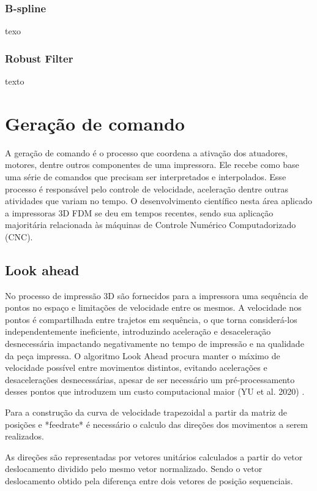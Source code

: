 \subsubsection{B-spline}
texo
\subsubsection{Robust Filter}
texto




\section{Geração de comando}
A geração de comando é o processo que coordena a ativação dos 
atuadores, motores, dentre outros componentes de uma impressora. 
Ele recebe como base uma série de comandos que precisam ser 
interpretados e interpolados. Esse processo é responsável pelo 
controle de velocidade, aceleração dentre outras atividades que 
variam no tempo. O desenvolvimento científico nesta área 
aplicado a impressoras 3D FDM se deu em tempos recentes, 
sendo sua aplicação majoritária relacionada às máquinas de 
Controle Numérico Computadorizado (CNC).

\subsection{Look ahead}
No processo de impressão 3D são fornecidos para a impressora 
uma sequência de pontos no espaço e limitações de velocidade 
entre os mesmos. A velocidade nos pontos é compartilhada entre 
trajetos em sequência, o que torna considerá-los 
independentemente ineficiente, introduzindo aceleração e 
desaceleração desnecessária impactando negativamente no tempo 
de impressão e na qualidade da peça impressa.
O algoritmo Look Ahead procura manter o máximo de velocidade 
possível entre movimentos distintos, evitando acelerações e 
desacelerações desnecessárias, apesar de ser necessário um 
pré-processamento desses pontos que introduzem um custo 
computacional maior (YU et al. 2020) \cite{yu20, klipperkinematic}.

Para a construção da curva de velocidade trapezoidal a partir da matriz de posições
e *feedrate* é necessário o calculo das direções dos movimentos a serem realizados.

As direções são representadas por vetores unitários calculados a partir
do vetor deslocamento dividido pelo mesmo vetor normalizado. Sendo o vetor deslocamento
obtido pela diferença entre dois vetores de posição sequenciais.

